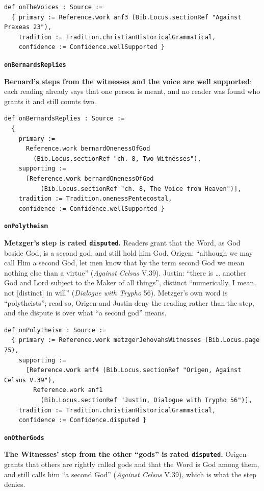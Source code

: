 \documentclass[11pt,paper=\testimonypaper,DIV=13,parskip=false]{scrartcl}
\begin{document}
{\small\begin{verbatim}
def onTheVoices : Source :=
  { primary := Reference.work anf3 (Bib.Locus.sectionRef "Against Praxeas 23"),
    tradition := Tradition.christianHistoricalGrammatical,
    confidence := Confidence.wellSupported }
\end{verbatim}}
\par\medskip\noindent\textbf{\texttt{on\allowbreak{}Bernards\allowbreak{}Replies}}\par\nobreak\noindent
\textbf{Bernard’s steps from the witnesses and the voice are well supported}: each reading already says that one person is meant, and no reader was found who grants it and still counts two.

{\small\begin{verbatim}
def onBernardsReplies : Source :=
  {
    primary :=
      Reference.work bernardOnenessOfGod
        (Bib.Locus.sectionRef "ch. 8, Two Witnesses"),
    supporting :=
      [Reference.work bernardOnenessOfGod
          (Bib.Locus.sectionRef "ch. 8, The Voice from Heaven")],
    tradition := Tradition.onenessPentecostal,
    confidence := Confidence.wellSupported }
\end{verbatim}}
\par\medskip\noindent\textbf{\texttt{on\allowbreak{}Polytheism}}\par\nobreak\noindent
\textbf{Metzger’s step is rated \texttt{disputed}.} Readers grant that the Word, as God beside God, is a second god, and still hold him God. Origen: “although we may call Him a second God, let men know that by the term second God we mean nothing else than a virtue” (\emph{Against Celsus} V.39). Justin: “there is … another God and Lord subject to the Maker of all things”, distinct “numerically, I mean, not [distinct] in will” (\emph{Dialogue with Trypho} 56). Metzger’s own word is “polytheists”; read so, Origen and Justin deny the reading rather than the step, and the dispute is over what “a second god” means.

{\small\begin{verbatim}
def onPolytheism : Source :=
  { primary := Reference.work metzgerJehovahsWitnesses (Bib.Locus.page 75),
    supporting :=
      [Reference.work anf4 (Bib.Locus.sectionRef "Origen, Against Celsus V.39"),
        Reference.work anf1
          (Bib.Locus.sectionRef "Justin, Dialogue with Trypho 56")],
    tradition := Tradition.christianHistoricalGrammatical,
    confidence := Confidence.disputed }
\end{verbatim}}
\par\medskip\noindent\textbf{\texttt{on\allowbreak{}Other\allowbreak{}Gods}}\par\nobreak\noindent
\textbf{The Witnesses’ step from the other “gods” is rated \texttt{disputed}.} Origen grants that others are rightly called gods and that the Word is God among them, and still calls him “a second God” (\emph{Against Celsus} V.39), which is what the step denies.
\end{document}
